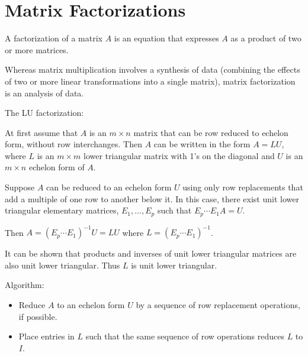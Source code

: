 \documentclass[../linalg.tex]{subfiles}
\begin{document}
\section{Matrix Factorizations}
A factorization of a matrix $A$ is an equation that expresses $A$ as a product of two or more matrices.

Whereas matrix multiplication involves a synthesis of data (combining the effects of two or more linear transformations into a single matrix), matrix factorization is an analysis of data.

The LU factorization:

At first assume that $A$ is an $m\times n$ matrix that can be row reduced to echelon form, without row interchanges. Then $A$ can be written in the form $A=LU$, where $L$ is an $m\times m$ lower triangular matrix 
with 1's on the diagonal and $U$ is an $m\times n$ echelon form of $A$.

Suppose $A$ can be reduced to an echelon form $U$ using only row replacements that add a multiple of one row to another below it. In this case, there exist unit lower triangular elementary matrices, $E_1,\dots,E_p$ such that $E_p\cdots E_1A=U$.

Then $A=(E_p\cdots E_1)^{-1}U=LU$ where $L=(E_p\cdots E_1)^{-1}$.

It can be shown that products and inverses of unit lower triangular matrices are also unit lower triangular. Thus $L$ is unit lower triangular.

Algorithm:
\begin{itemize}
    \item Reduce $A$ to an echelon form $U$ by a sequence of row replacement operations, if possible.
    \item Place entries in $L$ such that the same sequence of row operations reduces $L$ to $I$.
\end{itemize}
\end{document}
